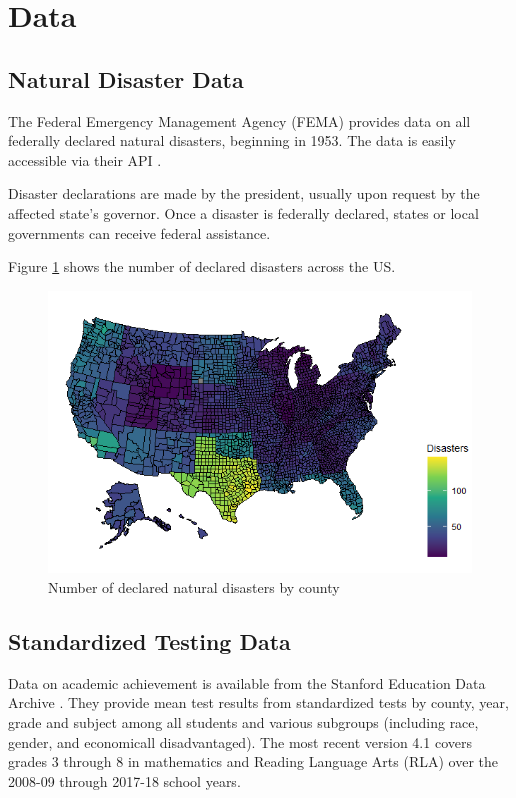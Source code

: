 
\section{Data}

\subsection{Natural Disaster Data}

The Federal Emergency Management Agency (FEMA) provides data on all federally declared natural disasters, beginning in 1953. The data is easily accessible via their API \citep{rfema}.

Disaster declarations are made by the president, usually upon request by the affected state's governor. Once a disaster is federally declared, states or local governments can receive federal assistance.

Figure \ref{DisasterMap} shows the number of declared disasters across the US.


\begin{figure}[!h]
	\centering
	\includegraphics[scale=0.7]{"../Code & Data/DisasterMap.png"}
	\caption{Number of declared natural disasters by county}
	\label{DisasterMap}
\end{figure}



\subsection{Standardized Testing Data}

Data on academic achievement is available from the Stanford Education Data Archive \citep{SEDA}. They provide mean test results from standardized tests by county, year, grade and subject among all students and various subgroups (including race, gender, and economicall disadvantaged). The most recent version 4.1 covers grades 3 through 8 in mathematics and Reading Language Arts (RLA) over the 2008-09 through 2017-18 school years.

